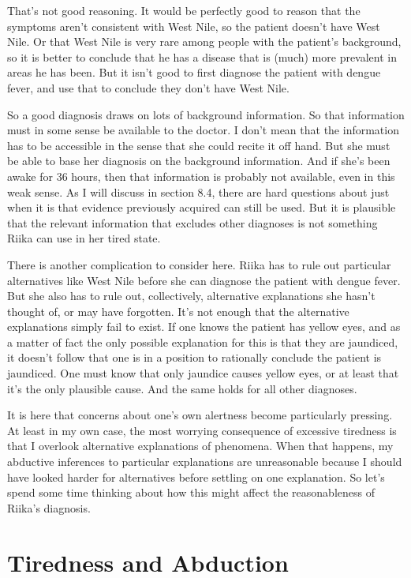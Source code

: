 \documentclass[
  10pt,
  letterpaper,
  twoside]{scrbook}
\begin{document}
That's not good reasoning. It would be perfectly good to reason that the
symptoms aren't consistent with West Nile, so the patient doesn't have
West Nile. Or that West Nile is very rare among people with the
patient's background, so it is better to conclude that he has a disease
that is (much) more prevalent in areas he has been. But it isn't good to
first diagnose the patient with dengue fever, and use that to conclude
they don't have West Nile.

So a good diagnosis draws on lots of background information. So that
information must in some sense be available to the doctor. I don't mean
that the information has to be accessible in the sense that she could
recite it off hand. But she must be able to base her diagnosis on the
background information. And if she's been awake for 36 hours, then that
information is probably not available, even in this weak sense. As I
will discuss in section 8.4, there are hard questions about just when it
is that evidence previously acquired can still be used. But it is
plausible that the relevant information that excludes other diagnoses is
not something {Riika} can use in her tired state.

There is another complication to consider here. {Riika} has to rule out
particular alternatives like West Nile before she can diagnose the
patient with dengue fever. But she also has to rule out, collectively,
alternative explanations she hasn't thought of, or may have forgotten.
It's not enough that the alternative explanations simply fail to exist.
If one knows the patient has yellow eyes, and as a matter of fact the
only possible explanation for this is that they are jaundiced, it
doesn't follow that one is in a position to rationally conclude the
patient is jaundiced. One must know that only jaundice causes yellow
eyes, or at least that it's the only plausible cause. And the same holds
for all other diagnoses.

It is here that concerns about one's own alertness become particularly
pressing. At least in my own case, the most worrying consequence of
excessive tiredness is that I overlook alternative explanations of
phenomena. When that happens, my abductive inferences to particular
explanations are unreasonable because I should have looked harder for
alternatives before settling on one explanation. So let's spend some
time thinking about how this might affect the reasonableness of
{Riika}'s diagnosis.

\section{Tiredness and Abduction}\label{tirednessandabduction}
\end{document}
